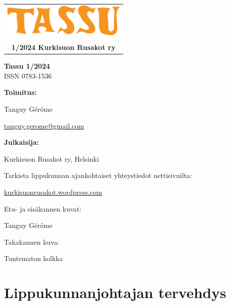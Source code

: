 \documentclass[10pt,finnish,a5paper,headings=small,twoside=semi]{scrartcl}
\begin{document}
\thispagestyle{empty}


\vspace*{5.70cm}

{\noindent\color{kuru}\begin{tabular}{@{}c@{}}
\includegraphics[width=6cm]{assets/logo} \\
\\
{\large\bfseries 1/2024 Kurkisuon Rusakot ry}
\end{tabular}\par}

\clearpage


\noindent \textbf{Tassu 1/2024} \\
\noindent ISSN 0783-1536

\vfill

\noindent\textbf{Toimitus:}

Tanguy Gérôme

\href{mailto:tanguy.gerome@gmail.com}{tanguy.gerome@gmail.com}

\medskip

\noindent\textbf{Julkaisija:}

Kurkisuon Rusakot ry, Helsinki

\medskip

\noindent Tarkista lippukunnan ajankohtaiset yhteystiedot nettisivuilta:

\href{https://kurkisuonrusakot.wordpress.com/}{kurkisuonrusakot.wordpress.com}

\medskip

\noindent Etu- ja sisäkannen kuvat:

Tanguy Gérôme

\noindent Takakannen kuva:

Tuntematon kolkka


\clearpage\tableofcontents

\clearpage\section{Lippukunnanjohtajan tervehdys}
\end{document}

